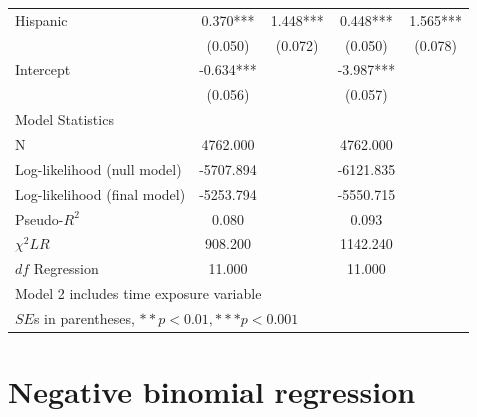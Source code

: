 \begin{table}[htbp]
\begin{tabular}{lcccc}
Hispanic     &    0.370***&    1.448***&    0.448***&    1.565***\\
      &   (0.050)  &   (0.072)  &   (0.050)  &   (0.078)  \\
Intercept    &   -0.634***&   &   -3.987***&    \\
      &   (0.056)  &   &   (0.057)  &    \\
\hline
\multicolumn{4}{l}{Model Statistics} \\
\hline
N      &  4762.000  &   &  4762.000  &   \\
Log-likelihood (null model)    &  -5707.894  &   &  -6121.835   \\
Log-likelihood (final model)     &  -5253.794  &   &  -5550.715  \\
Pseudo-$R^2$    &    0.080  &    &    0.093  &     \\
$\chi^2 LR$    &   908.200  &   &  1142.240  &   \\
$df$ Regression    &   11.000  &    &   11.000  &    \\
\hline
\multicolumn{4}{l}{Model 2 includes time exposure variable} \\
\multicolumn{4}{l}{$SE$s in parentheses, $**p<0.01, ***p<0.001$} \\
\hline
\end{tabular}
\end{table}

\section{Negative binomial regression}

